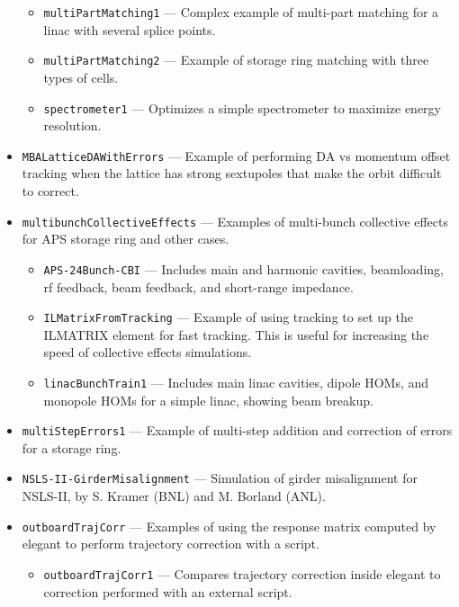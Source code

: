 \begin{itemize}
\begin{itemize}
\item \verb|multiPartMatching1| --- 
 Complex example of multi-part matching for a linac with several splice points. 

\item \verb|multiPartMatching2| --- 
 Example of storage ring matching with three types of cells. 

\item \verb|spectrometer1| --- 
 Optimizes a simple spectrometer to maximize energy resolution. 

\end{itemize}
\item \verb|MBALatticeDAWithErrors| --- 
Example of performing DA vs momentum offset tracking when the lattice has strong sextupoles that
make the orbit difficult to correct.

\item \verb|multibunchCollectiveEffects| --- 
Examples of multi-bunch collective effects for APS storage ring and other cases.

\begin{itemize}
\item \verb|APS-24Bunch-CBI| --- 
Includes main and harmonic cavities, beamloading, rf feedback, beam feedback, and short-range impedance.

\item \verb|ILMatrixFromTracking| --- 
Example of using tracking to set up the ILMATRIX element for fast tracking.
This is useful for increasing the speed of collective effects simulations.

\item \verb|linacBunchTrain1| --- 
Includes main linac cavities, dipole HOMs, and monopole HOMs for a simple linac, showing beam breakup.

\end{itemize}
\item \verb|multiStepErrors1| --- 
 Example of multi-step addition and correction of errors for a storage ring. 

\item \verb|NSLS-II-GirderMisalignment| --- 
 Simulation of girder misalignment for NSLS-II, by S. Kramer (BNL) and M. Borland (ANL). 

\item \verb|outboardTrajCorr| --- 
 Examples of using the response matrix computed by elegant to perform trajectory correction with a script. 

\begin{itemize}
\item \verb|outboardTrajCorr1| --- 
 Compares trajectory correction inside elegant to correction performed with an external script. 


\end{itemize}
\end{itemize}
